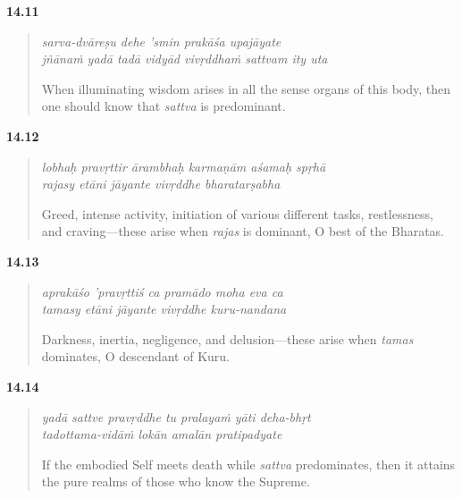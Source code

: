 \par\noindent\textbf{14.11}\par
\begin{verse}
\textit{sarva-dvāreṣu dehe ’smin prakāśa upajāyate} \\
\textit{jñānaṁ yadā tadā vidyād vivṛddhaṁ sattvam ity uta}

\noindent When illuminating wisdom arises in all the sense organs of this body, then one should know that \textit{sattva} is predominant.
\end{verse}
\par



\par\noindent\textbf{14.12}\par
\begin{verse}
\textit{lobhaḥ pravṛttir ārambhaḥ karmaṇām aśamaḥ spṛhā} \\
\textit{rajasy etāni jāyante vivṛddhe bharatarṣabha}

\noindent Greed, intense activity, initiation of various different tasks, restlessness, and craving---these arise when \textit{rajas} is dominant, O best of the Bharatas.
\end{verse}
\par



\par\noindent\textbf{14.13}\par
\begin{verse}
\textit{aprakāśo ’pravṛttiś ca pramādo moha eva ca} \\
\textit{tamasy etāni jāyante vivṛddhe kuru-nandana}

\noindent Darkness, inertia, negligence, and delusion---these arise when \textit{tamas} dominates, O descendant of Kuru.
\end{verse}
\par



\par\noindent\textbf{14.14}\par
\begin{verse}
\textit{yadā sattve pravṛddhe tu pralayaṁ yāti deha-bhṛt} \\
\textit{tadottama-vidāṁ lokān amalān pratipadyate}

\noindent If the embodied Self meets death while \textit{sattva} predominates, then it attains the pure realms of those who know the Supreme.
\end{verse}
\par



